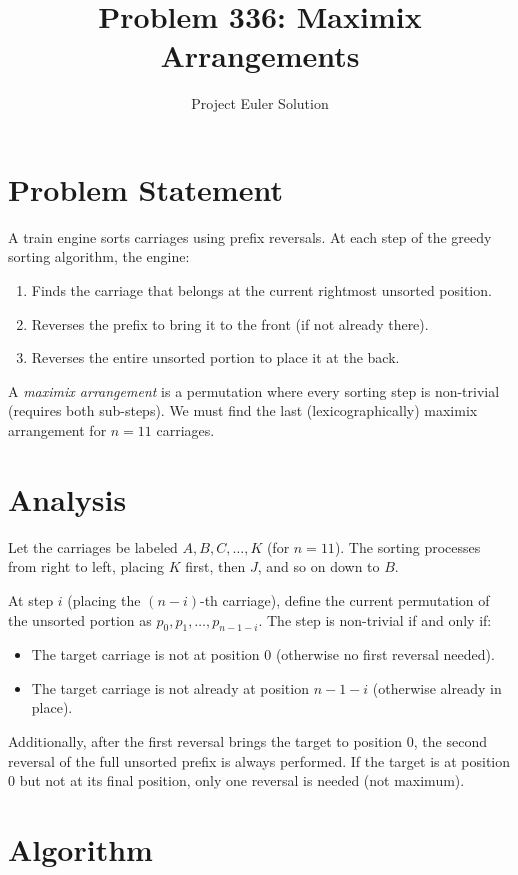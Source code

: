 \documentclass[12pt]{article}
\title{Problem 336: Maximix Arrangements}
\author{Project Euler Solution}
\date{}
\begin{document}
\maketitle

\section{Problem Statement}
A train engine sorts carriages using prefix reversals. At each step of the greedy sorting algorithm, the engine:
\begin{enumerate}
    \item Finds the carriage that belongs at the current rightmost unsorted position.
    \item Reverses the prefix to bring it to the front (if not already there).
    \item Reverses the entire unsorted portion to place it at the back.
\end{enumerate}

A \emph{maximix arrangement} is a permutation where every sorting step is non-trivial (requires both sub-steps). We must find the last (lexicographically) maximix arrangement for $n = 11$ carriages.

\section{Analysis}

Let the carriages be labeled $A, B, C, \ldots, K$ (for $n=11$). The sorting processes from right to left, placing $K$ first, then $J$, and so on down to $B$.

At step $i$ (placing the $(n-i)$-th carriage), define the current permutation of the unsorted portion as $p_0, p_1, \ldots, p_{n-1-i}$. The step is non-trivial if and only if:
\begin{itemize}
    \item The target carriage is not at position $0$ (otherwise no first reversal needed).
    \item The target carriage is not already at position $n-1-i$ (otherwise already in place).
\end{itemize}

Additionally, after the first reversal brings the target to position 0, the second reversal of the full unsorted prefix is always performed. If the target is at position 0 but not at its final position, only one reversal is needed (not maximum).

\section{Algorithm}
\end{document}
